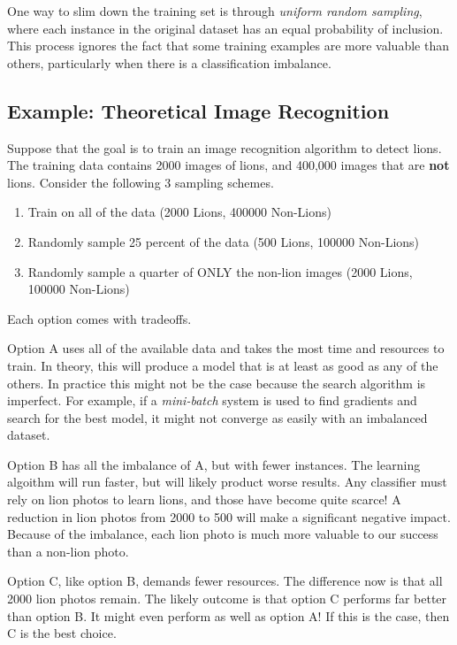 \documentclass[twoside]{article}
\begin{document}
One way to slim down the training set is through \textit{uniform random sampling}, where each instance in the original dataset has an equal probability of inclusion. This process ignores the fact that some training examples are more valuable than others, particularly when there is a classification imbalance.

\subsection{Example: Theoretical Image Recognition}
\label{section:lion}

Suppose that the goal is to train an image recognition algorithm to detect lions. The training data contains 2000 images of lions, and 400,000 images that are \textbf{not} lions. Consider the following 3 sampling schemes.

\begin{enumerate}[label=(\Alph*)]
\item Train on all of the data (2000 Lions, 400000 Non-Lions)
\item Randomly sample 25 percent of the data (500 Lions, 100000 Non-Lions)
\item Randomly sample a quarter of ONLY the non-lion images (2000 Lions, 100000 Non-Lions)
\end{enumerate}

Each option comes with tradeoffs.

Option A uses all of the available data and takes the most time and resources to train. In theory, this will produce a model that is at least as good as any of the others. In practice this might not be the case because the search algorithm is imperfect. For example, if a \textit{mini-batch} system is used to find gradients and search for the best model, it might not converge as easily with an imbalanced dataset.

Option B has all the imbalance of A, but with fewer instances. The learning algoithm will run faster, but will likely product worse results. Any classifier must rely on lion photos to learn lions, and those have become quite scarce! A reduction in lion photos from 2000 to 500 will make a significant negative impact. Because of the imbalance, each lion photo is much more valuable to our success than a non-lion photo. 

Option C, like option B, demands fewer resources. The difference now is that all 2000 lion photos remain. The likely outcome is that option C performs far better than option B. It might even perform as well as option A! If this is the case, then C is the best choice.
\end{document}
